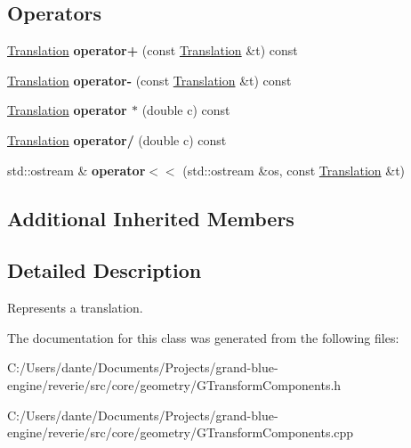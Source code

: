 \subsection*{Operators}
\begin{DoxyCompactItemize}
\item 
\mbox{\label{structrev_1_1_translation_a84b7e6164412757454ef6e2628a62b1b}} 
\mbox{\hyperlink{structrev_1_1_translation}{Translation}} {\bfseries operator+} (const \mbox{\hyperlink{structrev_1_1_translation}{Translation}} \&t) const
\item 
\mbox{\label{structrev_1_1_translation_a4d14f9b824d8db9465931fb9b908a54e}} 
\mbox{\hyperlink{structrev_1_1_translation}{Translation}} {\bfseries operator-\/} (const \mbox{\hyperlink{structrev_1_1_translation}{Translation}} \&t) const
\item 
\mbox{\label{structrev_1_1_translation_aac9ac99ea3f87fb2ab2c8f899309dc32}} 
\mbox{\hyperlink{structrev_1_1_translation}{Translation}} {\bfseries operator $\ast$} (double c) const
\item 
\mbox{\label{structrev_1_1_translation_a8c49a60c84145623cf867852e3b511d3}} 
\mbox{\hyperlink{structrev_1_1_translation}{Translation}} {\bfseries operator/} (double c) const
\item 
\mbox{\label{structrev_1_1_translation_ad10fed09e16acc56f1cd31057ad68048}} 
std\+::ostream \& {\bfseries operator$<$$<$} (std\+::ostream \&os, const \mbox{\hyperlink{structrev_1_1_translation}{Translation}} \&t)
\end{DoxyCompactItemize}
\subsection*{Additional Inherited Members}


\subsection{Detailed Description}
Represents a translation. 

The documentation for this class was generated from the following files\+:\begin{DoxyCompactItemize}
\item 
C\+:/\+Users/dante/\+Documents/\+Projects/grand-\/blue-\/engine/reverie/src/core/geometry/G\+Transform\+Components.\+h\item 
C\+:/\+Users/dante/\+Documents/\+Projects/grand-\/blue-\/engine/reverie/src/core/geometry/G\+Transform\+Components.\+cpp\end{DoxyCompactItemize}
